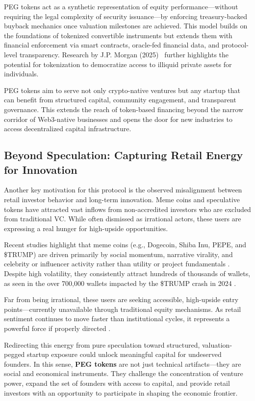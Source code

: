 \documentclass[conference]{IEEEtran}
\begin{document}
PEG tokens act as a synthetic representation of equity performance—without requiring the legal complexity of security issuance—by enforcing treasury-backed buyback mechanics once valuation milestones are achieved. This model builds on the foundations of tokenized convertible instruments but extends them with financial enforcement via smart contracts, oracle-fed financial data, and protocol-level transparency. Research by J.P. Morgan (2025)~\cite{bain2023tokenization} further highlights the potential for tokenization to democratize access to illiquid private assets for individuals.

PEG tokens aim to serve not only crypto-native ventures but any startup that can benefit from structured capital, community engagement, and transparent governance. This extends the reach of token-based financing beyond the narrow corridor of Web3-native businesses and opens the door for new industries to access decentralized capital infrastructure.

\subsection{Beyond Speculation: Capturing Retail Energy for Innovation}

Another key motivation for this protocol is the observed misalignment between retail investor behavior and long-term innovation. Meme coins and speculative tokens have attracted vast inflows from non-accredited investors who are excluded from traditional VC. While often dismissed as irrational actors, these users are expressing a real hunger for high-upside opportunities.

Recent studies highlight that meme coins (e.g., Dogecoin, Shiba Inu, PEPE, and \$TRUMP) are driven primarily by social momentum, narrative virality, and celebrity or influencer activity rather than utility or project fundamentals \cite{rutgers2023meme, sSrn4891841}. Despite high volatility, they consistently attract hundreds of thousands of wallets, as seen in the over 700,000 wallets impacted by the \$TRUMP crash in 2024 \cite{wikipediaTrump}.

Far from being irrational, these users are seeking accessible, high-upside entry points—currently unavailable through traditional equity mechanisms. As retail sentiment continues to move faster than institutional cycles, it represents a powerful force if properly directed \cite{marketwatch2022retail, arxiv2104.01847}.

Redirecting this energy from pure speculation toward structured, valuation-pegged startup exposure could unlock meaningful capital for undeserved founders. In this sense, \textbf{PEG tokens} are not just technical artifacts—they are social and economical instruments. They challenge the concentration of venture power, expand the set of founders with access to capital, and provide retail investors with an opportunity to participate in shaping the economic frontier.
\end{document}

